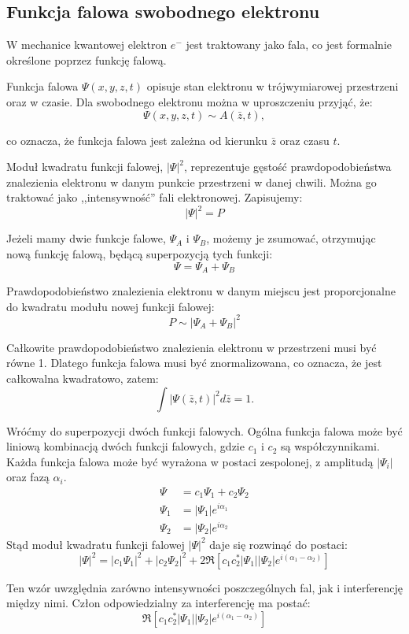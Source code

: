 \subsection{Funkcja falowa swobodnego elektronu}

W mechanice kwantowej elektron $e^-$ jest traktowany jako fala, co jest formalnie określone poprzez funkcję falową. 

Funkcja falowa $\Psi(x,y,z,t)$ opisuje stan elektronu w trójwymiarowej przestrzeni oraz w czasie. Dla swobodnego elektronu można w uproszczeniu przyjąć, że:
\begin{equation*}
    \Psi(x,y,z,t) \sim A(\bar{z}, t),
\end{equation*}

co oznacza, że funkcja falowa jest zależna od kierunku $\bar{z}$ oraz czasu $t$.

Moduł kwadratu funkcji falowej, $|\Psi|^2$, reprezentuje gęstość prawdopodobieństwa znalezienia elektronu w danym punkcie przestrzeni w danej chwili.
Można go traktować jako ,,intensywność'' fali elektronowej. Zapisujemy: 
\begin{equation*}
    |\Psi|^2 = P
\end{equation*}

Jeżeli mamy dwie funkcje falowe, $\Psi_A$ i $\Psi_B$, możemy je zsumować, otrzymując nową funkcję falową, będącą superpozycją tych funkcji:
\begin{equation*}
    \Psi = \Psi_A + \Psi_B
\end{equation*}

Prawdopodobieństwo znalezienia elektronu w danym miejscu jest proporcjonalne do kwadratu modułu nowej funkcji falowej:
\begin{equation*}
    P \sim |\Psi_A + \Psi_B|^2
\end{equation*}

Całkowite prawdopodobieństwo znalezienia elektronu w przestrzeni musi być równe 1.
Dlatego funkcja falowa musi być znormalizowana, co oznacza, że jest całkowalna kwadratowo, zatem:
\begin{equation*}
    \int |\Psi(\bar{z},t)|^2 d\bar{z} = 1.
\end{equation*}

Wróćmy do superpozycji dwóch funkcji falowych. Ogólna funkcja falowa może być liniową kombinacją dwóch funkcji falowych, gdzie $c_1$ i $c_2$ są współczynnikami.
Każda funkcja falowa może być wyrażona w postaci zespolonej, z amplitudą $|\Psi_i|$ oraz fazą $\alpha_i$.
\begin{align*}
    \Psi &= c_1 \Psi_1 + c_2 \Psi_2 \\
    \Psi_1 &= |\Psi_1| e^{i \alpha_1} \\
    \Psi_2 &= |\Psi_2| e^{i \alpha_2}
\end{align*}
Stąd moduł kwadratu funkcji falowej $|\Psi|^2$ daje się rozwinąć do postaci:
\begin{equation*}
    |\Psi|^2 = |c_1 \Psi_1|^2 + |c_2 \Psi_2|^2 + 2 \Re \left[ c_1 c_2^* |\Psi_1| |\Psi_2| e^{i (\alpha_1 - \alpha_2)} \right]
\end{equation*}

Ten wzór uwzględnia zarówno intensywności poszczególnych fal, jak i interferencję między nimi. Człon odpowiedzialny za interferencję ma postać:
\begin{equation*}
    \Re \left[ c_1 c_2^* |\Psi_1| |\Psi_2| e^{i (\alpha_1 - \alpha_2)} \right]
\end{equation*}


